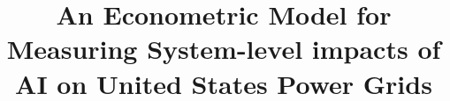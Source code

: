 \documentclass[sigconf]{acmart}
\begin{document}
\title{An Econometric Model for Measuring System-level impacts of AI on United States Power Grids}






\end{document}
